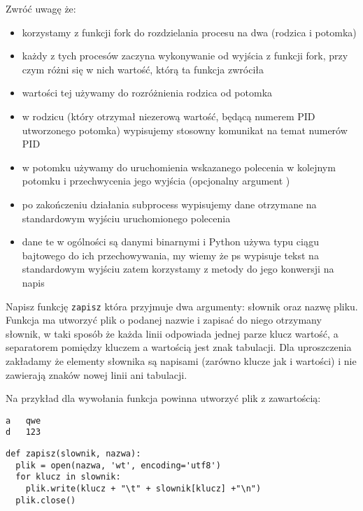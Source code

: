 \noindent Zwróć uwagę że:
\begin{itemize}
\item korzystamy z funkcji fork do rozdzielania procesu na dwa (rodzica i potomka)
\item każdy z tych procesów zaczyna wykonywanie od wyjścia z funkcji fork, przy czym różni się w nich wartość, którą ta funkcja zwróciła
\item wartości tej używamy do rozróżnienia rodzica od potomka
\item w rodzicu (który otrzymał niezerową wartość, będącą numerem PID utworzonego potomka) wypisujemy stosowny komunikat na temat numerów PID
\item w potomku używamy  do uruchomienia wskazanego polecenia w kolejnym potomku i przechwycenia jego wyjścia (opcjonalny argument )
\item po zakończeniu działania subprocess wypisujemy dane otrzymane na standardowym wyjściu uruchomionego polecenia
\item dane te w ogólności są danymi binarnymi i Python używa typu ciągu bajtowego do ich przechowywania, my wiemy że ps wypisuje tekst na standardowym wyjściu zatem korzystamy z metody  do jego konwersji na napis
\end{itemize}
\fi


\dbEntryCheckResults
Napisz funkcję \Verb#zapisz# która przyjmuje dwa argumenty: słownik oraz nazwę pliku. Funkcja ma utworzyć plik o podanej nazwie i zapisać do niego otrzymany słownik, w taki sposób że każda linii odpowiada jednej parze klucz wartość, a separatorem pomiędzy kluczem a wartością jest znak tabulacji. Dla uproszczenia zakładamy że elementy słownika są napisami (zarówno klucze jak i wartości) i nie zawierają znaków nowej linii ani tabulacji.

Na przykład dla wywołania  funkcja powinna utworzyć plik z zawartością:
\vspace{-8pt}\begin{Verbatim}
a	qwe
d	123
\end{Verbatim}
\fi

\dbEntryCheckResults
\begin{verbatim}
def zapisz(slownik, nazwa):
  plik = open(nazwa, 'wt', encoding='utf8')
  for klucz in slownik:
    plik.write(klucz + "\t" + slownik[klucz] +"\n")
  plik.close()
\end{verbatim}

